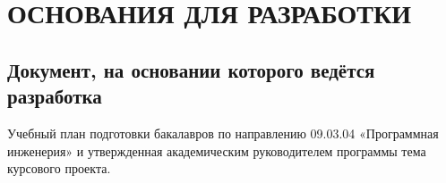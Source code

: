 \section{ОСНОВАНИЯ ДЛЯ РАЗРАБОТКИ}

\subsection{Документ, на основании которого ведётся разработка}

Учебный план подготовки бакалавров по направлению 09.03.04 «Программная инженерия» и утвержденная академическим руководителем программы тема курсового проекта.